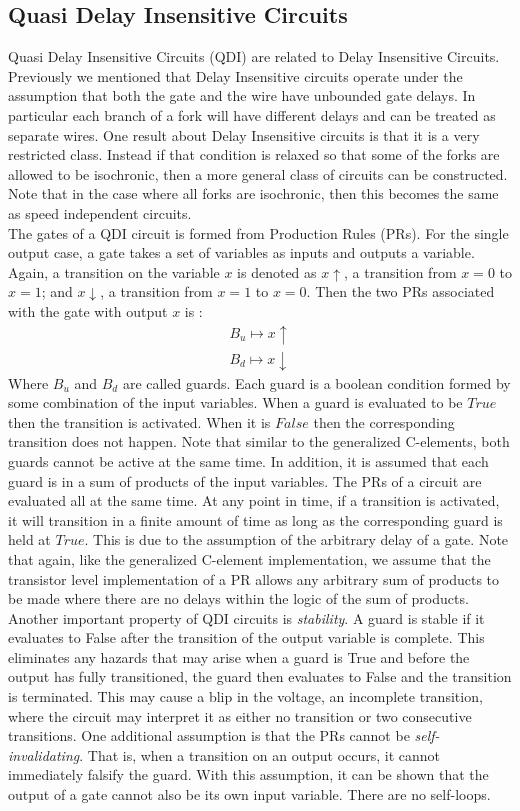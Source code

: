 \documentclass[12pt]{report}
\begin{document}
\subsection{Quasi Delay Insensitive Circuits}
Quasi Delay Insensitive Circuits (QDI) are related to Delay Insensitive Circuits. Previously we mentioned that Delay Insensitive circuits operate under the assumption that both the gate and the wire have unbounded gate delays. In particular each branch of a fork will have different delays and can be treated as separate wires. One result about Delay Insensitive circuits is that it is a very restricted class. Instead if that condition is relaxed so that some of the forks are allowed to be isochronic, then a more general class of circuits can be constructed. Note that in the case where all forks are isochronic, then this becomes the same as speed independent circuits. \\
The gates of a QDI circuit is formed from Production Rules (PRs). For the single output case, a gate takes a set of variables as inputs and outputs a variable. Again, a transition on the variable $x$ is denoted as $x\uparrow$, a transition from $x=0$ to $x=1$; and $x\downarrow$, a transition from $x=1$ to $x=0$. Then the two PRs associated with the gate with output $x$ is :
\begin{align*}
B_u\mapsto x\uparrow \\
B_d\mapsto x\downarrow 
\end{align*}
Where $B_u$ and $B_d$ are called guards. Each guard is a boolean condition formed by some combination of the input variables. When a guard is evaluated to be $True$ then the transition is activated. When it is $False$ then the corresponding transition does not happen. Note that similar to the generalized C-elements, both guards cannot be active at the same time. In addition, it is assumed that each guard is in a sum of products of the input variables. The PRs of a circuit are evaluated all at the same time. At any point in time, if a transition is activated, it will transition in a finite amount of time as long as the corresponding guard is held at $True$. This is due to the assumption of the arbitrary delay of a gate. Note that again, like the generalized C-element implementation, we assume that the transistor level implementation of a PR allows any arbitrary sum of products to be made where there are no delays within the logic of the sum of products.\\

Another important property of QDI circuits is \textit{stability}. A guard is stable if it evaluates to False after the transition of the output variable is complete. This eliminates any hazards that may arise when a guard is True and before the output has fully transitioned, the guard then evaluates to False and the transition is terminated. This may cause a blip in the voltage, an incomplete transition, where the circuit may interpret it as either no transition or two consecutive transitions. One additional assumption is that the PRs cannot be \textit{self-invalidating}. That is, when a transition on an output occurs, it cannot immediately falsify the guard. With this assumption, it can be shown that the output of a gate cannot also be its own input variable. There are no self-loops. 
\end{document}
